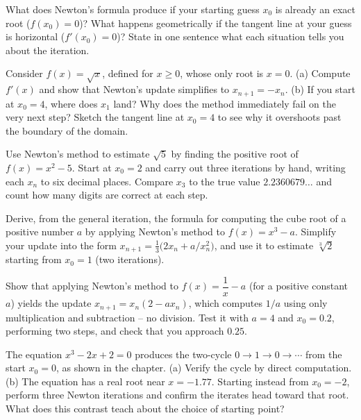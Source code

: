 \begin{exercise}
What does Newton's formula produce if your starting guess $x_0$ is already an exact
root ($f(x_0)=0$)? What happens geometrically if the tangent line at your guess is
horizontal ($f'(x_0)=0$)? State in one sentence what each situation tells you about
the iteration.
\end{exercise}

\begin{exercise}
Consider $f(x) = \sqrt{x}$, defined for $x \ge 0$, whose only root is $x = 0$.
(a) Compute $f'(x)$ and show that Newton's update simplifies to $x_{n+1} = -x_n$.
(b) If you start at $x_0 = 4$, where does $x_1$ land? Why does the method immediately
fail on the very next step? Sketch the tangent line at $x_0=4$ to see why it
overshoots past the boundary of the domain.
\end{exercise}

\begin{exercise}
Use Newton's method to estimate $\sqrt5$ by finding the positive root of
$f(x) = x^2 - 5$. Start at $x_0 = 2$ and carry out three iterations by hand, writing
each $x_n$ to six decimal places. Compare $x_3$ to the true value $2.2360679\ldots$
and count how many digits are correct at each step.
\end{exercise}

\begin{exercise}
Derive, from the general iteration, the formula for computing the cube root of a
positive number $a$ by applying Newton's method to $f(x) = x^3 - a$. Simplify your
update into the form $x_{n+1} = \tfrac13\bigl(2x_n + a/x_n^2\bigr)$, and use it to
estimate $\sqrt[3]{2}$ starting from $x_0 = 1$ (two iterations).
\end{exercise}

\begin{exercise}
Show that applying Newton's method to $f(x) = \dfrac1x - a$ (for a positive constant
$a$) yields the update $x_{n+1} = x_n(2 - a x_n)$, which computes $1/a$ using only
multiplication and subtraction -- no division. Test it with $a = 4$ and $x_0 = 0.2$,
performing two steps, and check that you approach $0.25$.
\end{exercise}

\begin{exercise}
The equation $x^3 - 2x + 2 = 0$ produces the two-cycle $0 \to 1 \to 0 \to \cdots$ from
the start $x_0 = 0$, as shown in the chapter. (a) Verify the cycle by direct
computation. (b) The equation has a real root near $x = -1.77$. Starting instead from
$x_0 = -2$, perform three Newton iterations and confirm the iterates head toward that
root. What does this contrast teach about the choice of starting point?
\end{exercise}

